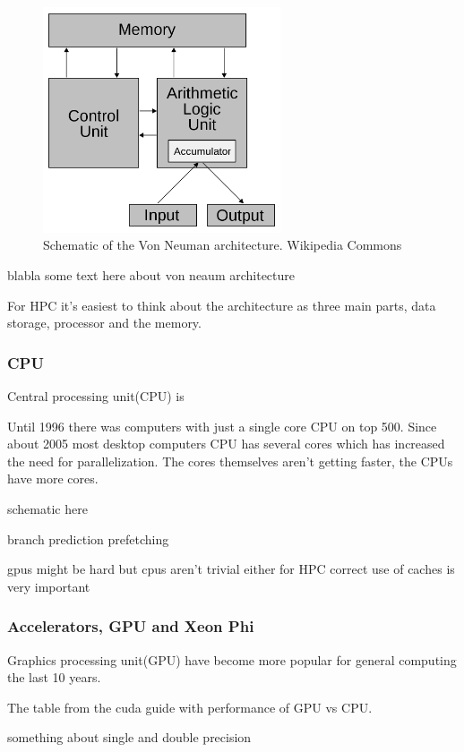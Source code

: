\documentclass[10pt,a4paper]{article}
\begin{document}
\begin{figure}[h]
    \centering
    \includegraphics[width=7cm]{Von_Neumann_architecture.png}
    \caption{Schematic of the Von Neuman architecture. Wikipedia Commons}
    \label{fig:VonNeuman}
\end{figure}

blabla some text here about von neaum architecture

For HPC it's easiest to think about the architecture as three main parts, data storage, processor and the memory.\cite{intro_hpc}

\subsubsection{CPU}
Central processing unit(CPU) is 

Until 1996 there was computers with just a single core CPU on top 500\cite{TOP500}. Since about 2005 most desktop computers CPU has several cores which has increased the need for parallelization. The cores themselves aren't getting faster, the CPUs have more cores.

schematic here

branch prediction
prefetching

gpus might be hard but cpus aren't trivial either for HPC
correct use of caches is very important\cite{drepper2007cpumemory}

\subsubsection{Accelerators, GPU and Xeon Phi}
Graphics processing unit(GPU) have become more popular for general computing the last 10 years.

The table from the cuda guide with performance of GPU vs CPU.\cite{cuda}

something about single and double precision
\end{document}
